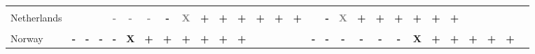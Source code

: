 \begin{figure}[!ht]
{\begin{tabular}{l*{27}{c}}
		 & \cellcolor{timberwolf}& \cellcolor{timberwolf} & \cellcolor{white} & \cellcolor{white} & \cellcolor{white} & \cellcolor{white} & \cellcolor{timberwolf} & \cellcolor{timberwolf}& \cellcolor{timberwolf}& \cellcolor{timberwolf} & \cellcolor{white} & \cellcolor{white} & \cellcolor{white} & \cellcolor{white} & \cellcolor{timberwolf} & \cellcolor{timberwolf}& \cellcolor{timberwolf}& \cellcolor{timberwolf} & \cellcolor{white} & \cellcolor{white} & \cellcolor{white} & \cellcolor{white} & \cellcolor{timberwolf} & \cellcolor{timberwolf}& \cellcolor{timberwolf} & \cellcolor{timberwolf}\\
		 
	{\normalsize Netherlands} \parbox[0pt][2em]{0cm}{} &  &  &  &  \textcolor{gray}{\textbf{-}} &  \textcolor{gray}{\textbf{-}} &  \textcolor{gray}{\textbf{-}} &  \textbf{-} &  \textcolor{gray}{\textbf{X}} &  \textbf{+} &  \textbf{+} &  \textbf{+} &  \textbf{+} &   \textbf{+} &  \textbf{+} &  &  \textbf{-} &  \textcolor{gray}{\textbf{X}} &  \textbf{+} &  \textbf{+} &  \textbf{+} &  \textbf{+} &  \textbf{+} &  \textbf{+} &  &  & \\ 
	
    	 & &  &  &  &  &  &  & & &  &  &  &  &  &  & & &  &  &  &  &  &  & &  & \\
    	  
	{\normalsize Norway} \parbox[0pt][2em]{0cm}{} &  \textbf{-} &  \textbf{-} &  \textbf{-} &  \textbf{-} &  \textbf{X} &  \textbf{+} &  \textbf{+} &  \textbf{+} &  \textbf{+} &  \textbf{+} &  \textbf{+} &  &  &  &  \textbf{-} &  \textbf{-} &  \textbf{-} &  \textbf{-} &  \textbf{-} &  \textbf{-} &  \textbf{X} &  \textbf{+} &  \textbf{+} &  \textbf{+} &  \textbf{+} &  \textbf{+}\\
	

\end{tabular}}
\end{figure}
